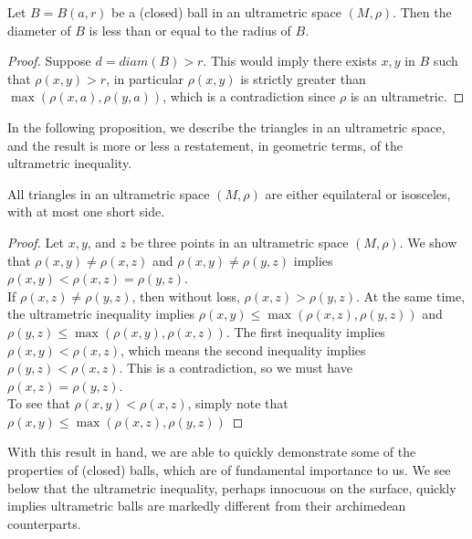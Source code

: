 \begin{proposition}
	Let $B=B(a, r)$ be a (closed) ball in an ultrametric space $(M,\rho)$. Then the diameter of $B$ is less than or equal to the radius of $B$.    
\end{proposition}

\begin{proof}
Suppose $d = diam(B) > r$. This would imply there exists $x,y$ in $B$ such that $\rho(x,y) > r$, in particular $\rho(x,y)$ is strictly greater than $\max(\rho(x,a), \rho(y,a))$, which is a contradiction since $\rho$ is an ultrametric.
\end{proof}

In the following proposition, we describe the triangles in an ultrametric space, and the result is more or less a restatement, in geometric terms, of the ultrametric inequality.\\

\begin{proposition}
	 All triangles in an ultrametric space $(M,\rho)$ are either equilateral or isosceles, with at most one short side. 
\end{proposition}

\begin{proof}
Let $x,y$, and $z$ be three points in an ultrametric space $(M,\rho)$. We show that $\rho(x,y) \neq \rho(x,z)$ and $\rho(x,y) \neq \rho(y,z)$ implies $\rho(x,y) < \rho(x,z) = \rho(y,z)$.\\

If $\rho(x,z) \neq \rho(y,z)$, then without loss, $\rho(x,z) > \rho(y,z)$. At the same time, the ultrametric inequality implies $\rho(x,y) \leq \max(\rho(x,z), \rho(y,z))$ and  $\rho(y,z) \leq \max(\rho(x,y), \rho(x,z))$. The first inequality implies $\rho(x,y) < \rho(x,z)$, which means the second inequality implies $\rho(y,z) < \rho(x,z)$. This is a contradiction, so we must have $\rho(x,z) = \rho(y,z)$.\\

To see that $\rho(x,y) < \rho(x,z)$, simply note that $\rho(x,y) \leq \max(\rho(x,z), \rho(y,z))$
\end{proof}

With this result in hand, we are able to quickly demonstrate some of the properties of (closed) balls, which are of fundamental importance to us. We see below that the ultrametric inequality, perhaps innocuous on the surface, quickly implies ultrametric balls are markedly different from their archimedean counterparts.\\


